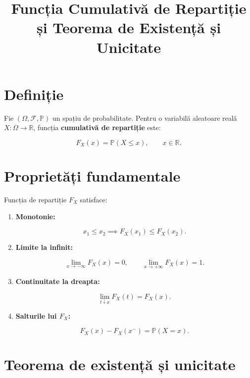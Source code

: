 \documentclass[12pt]{article}
\title{Funcția Cumulativă de Repartiție și Teorema de Existență și Unicitate}
\author{}
\date{}
\theoremstyle{plain}
\begin{document}
\maketitle

\section{Definiție}

Fie $(\Omega, \mathcal{F}, \mathbb{P})$ un spațiu de probabilitate.
Pentru o variabilă aleatoare reală $X : \Omega \to \mathbb{R}$, funcția
\textbf{cumulativă de repartiție} este:



\[
F_X(x) = \mathbb{P}(X \le x), \qquad x \in \mathbb{R}.
\]



\section{Proprietăți fundamentale}

Funcția de repartiție $F_X$ satisface:

\begin{enumerate}
    \item \textbf{Monotonie:}
    

\[
        x_1 \le x_2 \implies F_X(x_1) \le F_X(x_2).
    \]



    \item \textbf{Limite la infinit:}
    

\[
        \lim_{x \to -\infty} F_X(x) = 0, \qquad
        \lim_{x \to +\infty} F_X(x) = 1.
    \]



    \item \textbf{Continuitate la dreapta:}
    

\[
        \lim_{t \downarrow x} F_X(t) = F_X(x).
    \]



    \item \textbf{Salturile lui $F_X$:}
    

\[
        F_X(x) - F_X(x^-) = \mathbb{P}(X = x).
    \]


\end{enumerate}

\section{Teorema de existență și unicitate}
\end{document}
